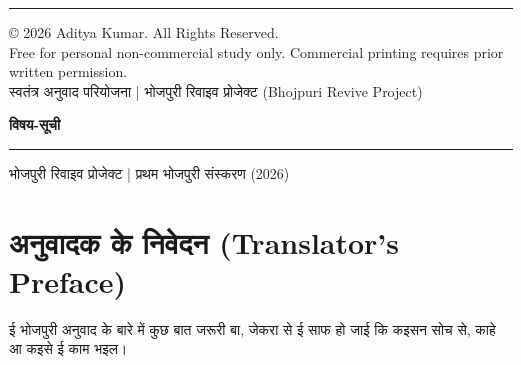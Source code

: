 \documentclass[12pt,a4paper,oneside]{book}
\begin{document}
\begin{center}
\begin{minipage}{0.92\textwidth}
  \vspace*{0.4em}
  {\color{bordercolor}\rule{\textwidth}{0.4pt}}
  \vspace*{0.4em}

  \begin{center}
    {\engfont \copyright{} 2026 Aditya Kumar. All Rights Reserved.} \\
    {\footnotesize {\engfont Free for personal non-commercial study only. Commercial printing requires prior written permission.}} \\
    \vspace*{0.3em}
    {\small स्वतंत्र अनुवाद परियोजना | भोजपुरी रिवाइव प्रोजेक्ट {\engfont (Bhojpuri Revive Project)}}
  \end{center}
\end{minipage}
\end{center}

\newpage
\thispagestyle{empty}

\begin{center}
  {\Large \bfseries \color{bordercolor} विषय-सूची} \\[0.4em]
  {\color{bordercolor}\rule{0.3\textwidth}{0.8pt}}
\end{center}

\vspace*{0.6cm}

\renewcommand{\contentsname}{}
\setcounter{tocdepth}{2}
{\makeatletter
\renewcommand{\@dotsep}{4.5}
\makeatother
\tableofcontents}

\vfill
\begin{center}
  {\small \color{bordercolor} भोजपुरी रिवाइव प्रोजेक्ट | प्रथम भोजपुरी संस्करण (2026)}
\end{center}

\newpage

\cleardoublepage
\cleardoublepage
\chapter*{अनुवादक के निवेदन {\engfont (Translator's Preface)}}
ई भोजपुरी अनुवाद के बारे में कुछ बात जरूरी बा, जेकरा से ई साफ हो जाई कि कइसन सोच से, काहे आ कइसे ई काम भइल।
\end{document}
